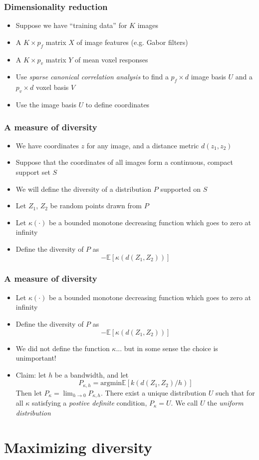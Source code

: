 \documentclass{beamer}
\begin{document}
\begin{frame}
\frametitle{Dimensionality reduction}
\begin{itemize}
\item Suppose we have ``training data'' for $K$ images
\item A $K \times p_f$ matrix $X$ of image features (e.g. Gabor filters)
\item A $K \times p_v$ matrix $Y$ of mean voxel responses
\item Use \emph{sparse canonical correlation analysis} to find a $p_f
  \times d$ image basis $U$ and a $p_v \times d$ voxel basis $V$
\item Use the image basis $U$ to define coordinates
\end{itemize}
\end{frame}


\begin{frame}
\frametitle{A measure of diversity}
\begin{itemize}
\item We have coordinates $z$ for any image, and a distance metric $d(z_1, z_2)$
\item Suppose that the coordinates of all images form a continuous, compact support set $S$
\item We will define the diversity of a distribution $P$ supported on $S$
\item Let $Z_1$, $Z_2$ be random points drawn from $P$
\item Let $\kappa(\cdot)$ be a bounded monotone decreasing function which goes to zero at infinity
\item Define the diversity of $P$ as
\[
-\mathbb{E}[\kappa(d(Z_1, Z_2))]
\]
\end{itemize}
\end{frame}

\begin{frame}
\frametitle{A measure of diversity}
\begin{itemize}
\item Let $\kappa(\cdot)$ be a bounded monotone decreasing function which goes to zero at infinity
\item Define the diversity of $P$ as
\[
-\mathbb{E}[\kappa(d(Z_1, Z_2))]
\]
\item We did not define the function $\kappa$... but in some sense the choice is unimportant!
\item Claim: let $h$ be a bandwidth, and let 
\[P_{\kappa, h} = \text{argmin} \mathbb{E}[k(d(Z_1, Z_2)/h)]\]
Then let $P_\kappa = \lim_{h \to 0} P_{\kappa, h}$.
There exist a unique distribution $U$ such that for all $\kappa$ satisfying a \emph{postive definite} condition, $P_\kappa = U$.
We call $U$ the \emph{uniform distribution}
\end{itemize}
\end{frame}


\section{Maximizing diversity}

\frame{\sectionpage}
\end{document}

